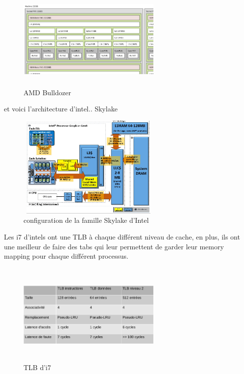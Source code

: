 \documentclass[oneside]{book}
\begin{document}
\begin{figure}[!ht]
\centering
\includegraphics[height = 5cm, width=7cm, keepaspectratio]{AMDbulldozer.png}
\caption{AMD Bulldozer}
\label{fig:bulldozer}
\end{figure}

et voici l'architecture d'intel.. Skylake
\begin{figure}[!ht]
\centering
\includegraphics[height=5cm, width=7cm, keepaspectratio]{skylake.png}
\caption{configuration de la famille Skylake d'Intel}
\label{fig:skylake}
\end{figure}
Les i7 d'intels ont une TLB à chaque différent niveau de cache, en plus, ils ont une meilleur de faire des tabs qui leur permettent de garder leur memory mapping pour chaque différent processus.

\begin{figure}[!ht]
\centering
\includegraphics[height=5cm, width=7cm, keepaspectratio]{TLBi7.png}
\caption{TLB d'i7}
\label{fig:TLB}
\end{figure}
\end{document}
